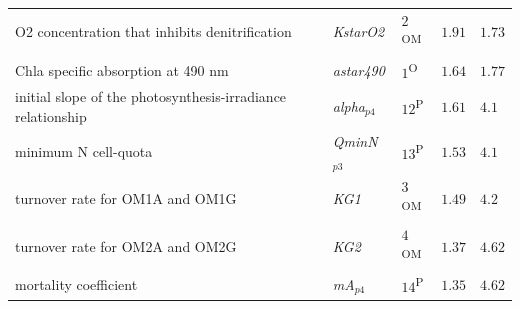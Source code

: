\documentclass[letterpaper,12pt,oneside]{article}\usepackage[]{graphicx}\usepackage[]{color}
\begin{document}
\begin{table}[!tbp]
{\begin{center}
\begin{tabular}{lllll}
\scriptsize{O2 concentration that inhibits denitrification}&\scriptsize{\textit{KstarO2}}&$2$\textsuperscript{OM}&$1.91$&$1.73$\tabularnewline
\scriptsize{Chla specific absorption at 490 nm}&\scriptsize{\textit{astar490}}&$1$\textsuperscript{O}&$1.64$&$1.77$\tabularnewline
\scriptsize{initial slope of the photosynthesis-irradiance relationship}&\scriptsize{\textit{alpha$_{p4}$}}&$12$\textsuperscript{P}&$1.61$&$4.1$\tabularnewline
\scriptsize{minimum N cell-quota}&\scriptsize{\textit{QminN$_{p3}$}}&$13$\textsuperscript{P}&$1.53$&$4.1$\tabularnewline
\scriptsize{turnover rate for OM1A and OM1G}&\scriptsize{\textit{KG1}}&$3$\textsuperscript{OM}&$1.49$&$4.2$\tabularnewline
\scriptsize{turnover rate for OM2A and OM2G}&\scriptsize{\textit{KG2}}&$4$\textsuperscript{OM}&$1.37$&$4.62$\tabularnewline
\scriptsize{mortality coefficient}&\scriptsize{\textit{mA$_{p4}$}}&$14$\textsuperscript{P}&$1.35$&$4.62$\tabularnewline
\hline
\end{tabular}\end{center}}

\end{table}
\end{document}
